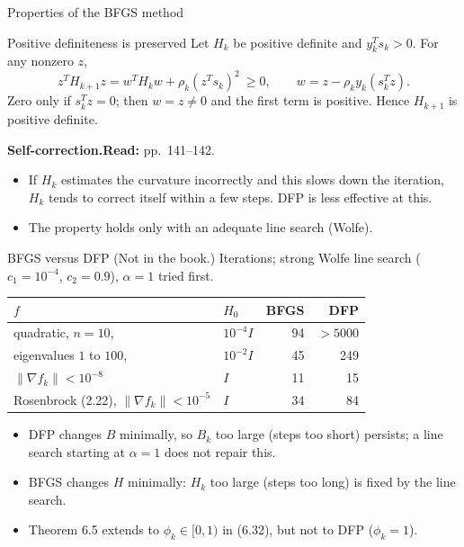 \documentclass[aspectratio=169,12pt]{beamer}
\newcommand{\gradf}{\nabla f}
\newcommand{\readbook}[1]{{\color{red}\textbf{Read:} #1}}
\newcommand{\notinbook}{{\small(Not in the book.)}}
\begin{document}
\begin{frame}{Properties of the BFGS method}
  \begin{block}{Positive definiteness is preserved}
    Let $H_{k}$ be positive definite and $y_{k}^{T}s_{k}>0$. For any nonzero $z$,
    \[
      z^{T}H_{k+1}z=w^{T}H_{k}w+\rho_{k}(z^{T}s_{k})^{2}\ \ge 0,
      \qquad w=z-\rho_{k}y_{k}(s_{k}^{T}z) .
    \]
    Zero only if $s_{k}^{T}z=0$; then $w=z\ne 0$ and the first term is positive.
    Hence $H_{k+1}$ is positive definite.
  \end{block}

  \textbf{Self-correction.}\hfill\readbook{pp.~141--142.}
  \begin{itemize}\setlength\itemsep{0.25em}
    \item If $H_{k}$ estimates the curvature incorrectly and this slows down the iteration,
      $H_{k}$ tends to correct itself within a few steps. DFP is less effective at this.
    \item The property holds only with an adequate line search (Wolfe).
  \end{itemize}
\end{frame}

\begin{frame}{BFGS versus DFP \notinbook}
  Iterations; strong Wolfe line search ($c_{1}=10^{-4}$, $c_{2}=0.9$), $\alpha=1$ tried first.
  \vspace{-0.4em}
  \begin{center}
  \setlength\tabcolsep{8pt}
  \begin{tabular}{llrr}
    \toprule
    $f$ & $H_{0}$ & BFGS & DFP \\
    \midrule
    quadratic, $n=10$, & $10^{-4}I$ & 94 & $>5000$ \\
    \quad eigenvalues $1$ to $100$, & $10^{-2}I$ & 45 & 249 \\
    \quad $\|\gradf_{k}\|<10^{-8}$ & $I$ & 11 & 15 \\
    Rosenbrock (2.22), $\|\gradf_{k}\|<10^{-5}$ & $I$ & 34 & 84 \\
    \bottomrule
  \end{tabular}
  \end{center}
  \begin{itemize}\setlength\itemsep{0.25em}
    \item DFP changes $B$ minimally, so $B_{k}$ too large (steps too short) persists; a line
      search starting at $\alpha=1$ does not repair this.
    \item BFGS changes $H$ minimally: $H_{k}$ too large (steps too long) is fixed by the line search.
    \item Theorem 6.5 extends to $\phi_{k}\in[0,1)$ in (6.32), \alert{but not to DFP} ($\phi_{k}=1$).
  \end{itemize}
\end{frame}
\end{document}

